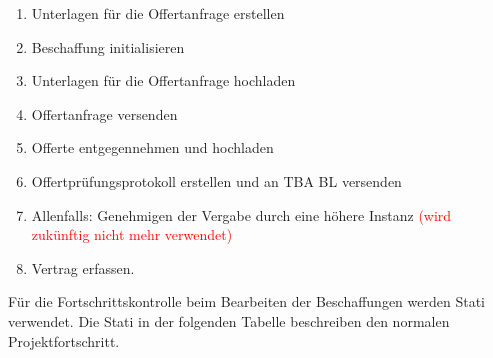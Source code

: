 \begin{enumerate}
\item
Unterlagen für die Offertanfrage erstellen
\item
Beschaffung initialisieren
\item
Unterlagen für die Offertanfrage hochladen
\item
Offertanfrage versenden
\item
Offerte entgegennehmen und hochladen
\item
Offertprüfungsprotokoll erstellen und an TBA BL versenden
\item
Allenfalls: Genehmigen der Vergabe durch eine höhere Instanz \textcolor{red}{(wird zukünftig nicht mehr verwendet)}
\item
Vertrag erfassen.
\end{enumerate}

Für die Fortschrittskontrolle beim Bearbeiten der Beschaffungen werden Stati verwendet. Die Stati in der folgenden Tabelle beschreiben den normalen Projektfortschritt.

\vspace{\baselineskip}

